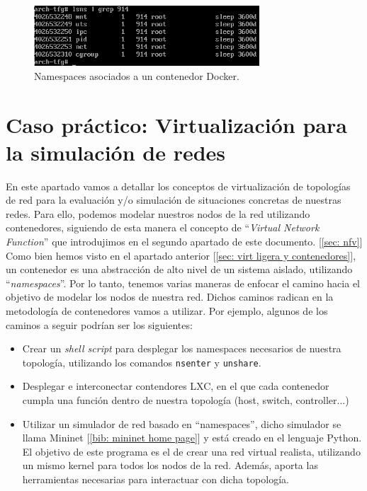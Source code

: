 \documentclass[a4paper, oneside, 12pt]{book}
\begin{document}
	\begin{figure}[h!]
		\begin{center}
			\includegraphics[width=0.75\textwidth]{img/docker_ns5.png}
			\caption{Namespaces asociados a un contenedor Docker.}
		\end{center}
	\end{figure}
	
	\pagebreak

	\chapter{Caso práctico: Virtualización para la simulación de redes}
	
	\noindent En este apartado vamos a detallar los conceptos de virtualización de topologías de red para la evaluación y/o simulación de situaciones concretas de nuestras redes. Para ello, podemos modelar nuestros nodos de la red utilizando contenedores, siguiendo de esta manera el concepto de ``\textit{Virtual Network Function}'' que introdujimos en el segundo apartado de este documento. [\ref{sec: nfv}] \\
	
	\noindent Como bien hemos visto en el apartado anterior [\ref{sec: virt ligera y contenedores}], un contenedor es una abstracción de alto nivel de un sistema aislado, utilizando ``\textit{namespaces}''. Por lo tanto, tenemos varias maneras de enfocar el camino hacia el objetivo de modelar los nodos de nuestra red. Dichos caminos radican en la metodología de contenedores vamos a utilizar. Por ejemplo, algunos de los caminos a seguir podrían ser los siguientes:
	
	\begin{itemize}
		\item Crear un \textit{shell script} para desplegar los namespaces necesarios de nuestra topología, utilizando los comandos \texttt{nsenter} y \texttt{unshare}.
		\item Desplegar e interconectar contendores LXC, en el que cada contenedor cumpla una función dentro de nuestra topología (host, switch, controller...)
		\item Utilizar un simulador de red basado en ``namespaces'', dicho simulador se llama Mininet [\ref{bib: mininet home page}] y está creado en el lenguaje Python. El objetivo de este programa es el de crear una red virtual realista, utilizando un mismo kernel para todos los nodos de la red. Además, aporta las herramientas necesarias para interactuar con dicha topología.
	\end{itemize}
	
\end{document}
